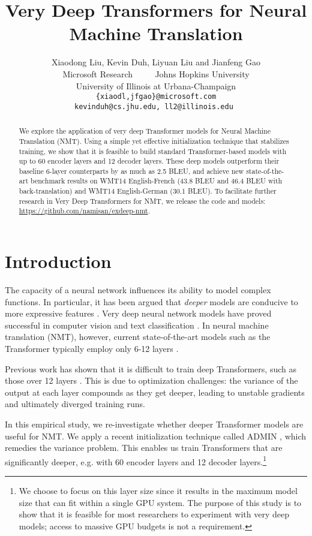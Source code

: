 \documentclass[11pt,a4paper]{article}
\title{Very Deep Transformers for Neural Machine Translation}
\author{
Xiaodong Liu, Kevin Duh, Liyuan Liu and Jianfeng Gao
 \\ 
   Microsoft Research ~~~~
 Johns Hopkins University \\
   University of Illinois at Urbana-Champaign\\
  {\tt \{xiaodl,jfgao\}@microsoft.com} \\
  \tt kevinduh@cs.jhu.edu, ll2@illinois.edu
}
\date{}
\begin{document}
\maketitle


\begin{abstract}

We explore the application of very deep Transformer models for Neural Machine Translation (NMT). 
Using a simple yet effective initialization technique that stabilizes training, we show that it is feasible to build standard Transformer-based models with up to 60 encoder layers and 12 decoder layers. 
These deep models outperform their baseline 6-layer counterparts by as much as 2.5 BLEU, and achieve
new state-of-the-art benchmark results on 
WMT14 English-French (43.8 BLEU and 46.4 BLEU with back-translation) and WMT14 English-German (30.1 BLEU).
To facilitate further research in Very Deep Transformers for NMT, we release the code and models: \url{https://github.com/namisan/exdeep-nmt}.
\end{abstract}
 

\section{Introduction}
\label{sec:intro}

The capacity of a neural network influences its ability to model complex functions. 
In particular, it has been argued that \textit{deeper} models are conducive to more expressive features \cite{bengio09book}.
Very deep neural network models have proved successful in computer vision \cite{he2016resnet,srivastava2015deepnn} and text classification \cite{conneau2017deepclassification,minaee2020deep}.
In neural machine translation (NMT), however, current state-of-the-art models such as the Transformer typically employ only 6-12 layers \cite{wmt19edinburg, wmt19ms, wmt19fair}.

Previous work has shown that it is difficult to train deep Transformers, such as those over 12 layers \cite{bapna2018training}.
This is due to optimization challenges: the variance of the output at each layer compounds as they get deeper, leading to unstable gradients and ultimately diverged training runs.


In this empirical study, we re-investigate whether deeper Transformer models are useful for NMT. 
We apply a recent initialization technique called ADMIN \cite{liu2020deeptransformer}, which remedies the variance problem. This enables us train Transformers that are significantly deeper, e.g. with 60 encoder layers and 12 decoder layers.\footnote{We choose to focus on this layer size since it results in the maximum model size that can fit within a single GPU system. The purpose of this study is to show that it is feasible for most researchers to experiment with very deep models; access to massive GPU budgets is not a requirement.}
\end{document}
